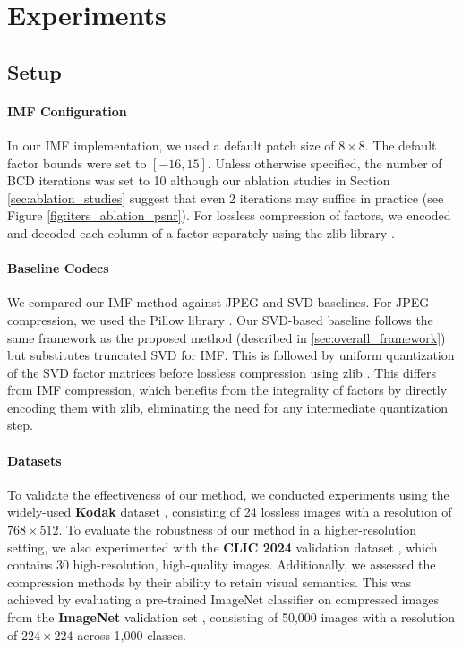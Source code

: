 \section{Experiments} \label{sec:experiments}

\subsection{Setup} \label{sec:setup}

\paragraph{IMF Configuration}
In our IMF implementation, we used a default patch size of $8 \times 8$. The default factor bounds were set to $[-16, 15]$. Unless otherwise specified, the number of BCD iterations was set to 10 although our ablation studies in Section \ref{sec:ablation_studies} suggest that even 2 iterations may suffice in practice (see Figure \ref{fig:iters_ablation_psnr}). For lossless compression of factors, we encoded and decoded each column of a factor separately using the zlib library \cite{deutsch1996zlib}.

\paragraph{Baseline Codecs}
We compared our IMF method against JPEG and SVD baselines. For JPEG compression, we used the Pillow library \cite{clark2015pillow}. Our SVD-based baseline follows the same framework as the proposed method (described in \ref{sec:overall_framework}) but substitutes truncated SVD for IMF. This is followed by uniform quantization of the SVD factor matrices before lossless compression using zlib \cite{deutsch1996zlib}. This differs from IMF compression, which benefits from the integrality of factors by directly encoding them with zlib, eliminating the need for any intermediate quantization step.

\paragraph{Datasets}
To validate the effectiveness of our method, we conducted experiments using the widely-used \textbf{Kodak} dataset \cite{kodak1993}, consisting of 24 lossless images with a resolution of $768 \times 512$. To evaluate the robustness of our method in a higher-resolution setting, we also experimented with the \textbf{CLIC 2024} validation dataset \cite{clic2024}, which contains 30 high-resolution, high-quality images. Additionally, we assessed the compression methods by their ability to retain visual semantics. This was achieved by evaluating a pre-trained ImageNet classifier on compressed images from the \textbf{ImageNet} validation set \cite{russakovsky2015imagenet}, consisting of 50,000 images with a resolution of $224 \times 224$ across 1,000 classes.

